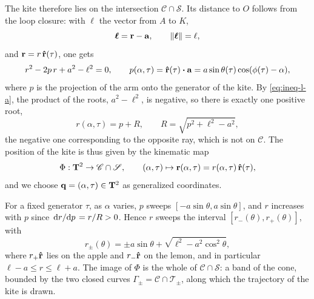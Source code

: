 The kite therefore lies on the intersection \(\mathscr{C}\cap\mathscr{S}\).
Its distance to \(O\) follows from the loop closure: with \(\boldsymbol{\ell}\) the vector from \(A\) to \(K\),
\begin{equation} \label{eq:loop}
    \boldsymbol{\ell} = \vb r - \vb a, \qquad \norm{\boldsymbol{\ell}} = \ell,
\end{equation}
and \(\vb r = r\,\vu r(\tau)\), one gets
\begin{equation} \label{eq:radial-quadratic}
    r^2 - 2p\,r + a^2 - \ell^2 = 0, \qquad p(\alpha,\tau) = \vu r(\tau)\vdot\vb a = a\sin\theta(\tau)\cos(\phi(\tau)-\alpha),
\end{equation}
where \(p\) is the projection of the arm onto the generator of the kite.
By \eqref{eq:ineq-l-a}, the product of the roots, \(a^2-\ell^2\), is negative, so there is exactly one positive root,
\begin{equation} \label{eq:radial}
    r(\alpha,\tau) = p + R, \qquad R = \sqrt{p^2+\ell^2-a^2},
\end{equation}
the negative one corresponding to the opposite ray, which is not on \(\mathscr{C}\).
The position of the kite is thus given by the kinematic map
\begin{equation} \label{eq:kinematic-map}
    \Phi : \mathbf{T}^2 \to \mathscr{C}\cap\mathscr{S}, \qquad (\alpha,\tau) \mapsto \vb r(\alpha,\tau) = r(\alpha,\tau)\,\vu r(\tau),
\end{equation}
and we choose \(\vb q = (\alpha,\tau)\in\mathbf{T}^2\) as generalized coordinates.

For a fixed generator \(\tau\), as \(\alpha\) varies, \(p\) sweeps \([-a\sin\theta, a\sin\theta]\), and \(r\) increases with \(p\) since \(\dv*{r}{p} = r/R > 0\).
Hence \(r\) sweeps the interval \([r_-(\theta), r_+(\theta)]\), with
\begin{equation}
    r_\pm(\theta) = \pm a\sin\theta + \sqrt{\ell^2 - a^2\cos^2\theta},
\end{equation}
where \(r_+\vu r\) lies on the apple and \(r_-\vu r\) on the lemon, and in particular \(\ell - a \leq r \leq \ell + a\).
The image of \(\Phi\) is the whole of \(\mathscr{C}\cap\mathscr{S}\): a band of the cone, bounded by the two closed curves \(\Gamma_\pm = \mathscr{C}\cap\mathscr{T}_\pm\), along which the trajectory of the kite is drawn.

